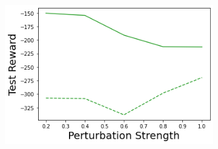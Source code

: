 \begin{figure}
\begin{subfigure}{.24\textwidth}
    \end{subfigure}
    \begin{subfigure}{.24\textwidth}
        \includegraphics[width=\textwidth]{sections/011_icml2022/resources/transition_shift-PostNet-AcrobotShift-v0-mean_reward_.png}
    \end{subfigure}
    

\end{figure}
